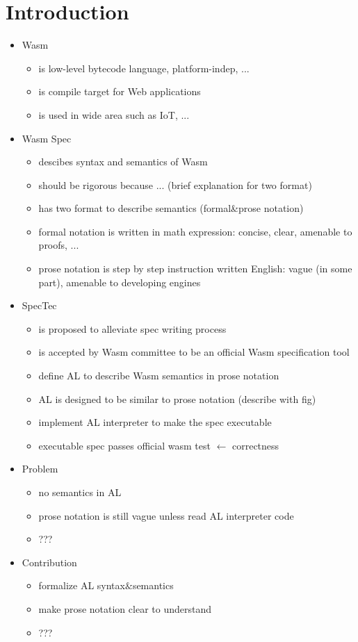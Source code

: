 
\chapter{Introduction}
\label{ch:intro}
\noindent

\begin{itemize}
\item Wasm
  \begin{itemize}
  \item is low-level bytecode language, platform-indep, ...
  \item is compile target for Web applications
  \item is used in wide area such as IoT, ...
  \end{itemize}
\item Wasm Spec
  \begin{itemize}
  \item descibes syntax and semantics of Wasm
  \item should be rigorous because ... (brief explanation for two format)
  \item has two format to describe semantics (formal\&prose notation)
  \item formal notation is written in math expression: concise, clear, amenable to proofs, ...
  \item prose notation is step by step instruction written English: vague (in some part), amenable to developing engines
  \end{itemize}
\item SpecTec
  \begin{itemize}
  \item is proposed to alleviate spec writing process
  \item is accepted by Wasm committee to be an official Wasm specification tool
  \item define AL to describe Wasm semantics in prose notation
  \item AL is designed to be similar to prose notation (describe with fig)
  \item implement AL interpreter to make the spec executable
  \item executable spec passes official wasm test $\leftarrow$ correctness
  \end{itemize}
\item Problem
  \begin{itemize}
  \item no semantics in AL
  \item prose notation is still vague unless read AL interpreter code
  \item ???
  \end{itemize}
\item Contribution
  \begin{itemize}
  \item formalize AL syntax$\&$semantics
  \item make prose notation clear to understand
  \item ???
  \end{itemize}
\end{itemize}
